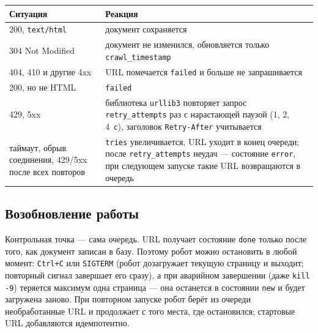 \begin{tabular}{|p{5.2cm}|p{10cm}|}
\hline
Ситуация & Реакция \\ \hline
200, \texttt{text/html} & документ сохраняется \\ \hline
304 Not Modified & документ не изменился, обновляется только
\texttt{crawl\_timestamp} \\ \hline
404, 410 и другие 4xx & URL помечается \texttt{failed} и больше не
запрашивается \\ \hline
200, но не HTML & \texttt{failed} \\ \hline
429, 5xx & библиотека \texttt{urllib3} повторяет запрос
\texttt{retry\_attempts} раз с нарастающей паузой (1, 2, 4~с), заголовок
\texttt{Retry-After} учитывается \\ \hline
таймаут, обрыв соединения, 429/5xx после всех повторов & \texttt{tries}
увеличивается, URL уходит в конец очереди; после \texttt{retry\_attempts}
неудач --- состояние \texttt{error}, при следующем запуске такие URL
возвращаются в очередь \\ \hline
\end{tabular}

\subsection{Возобновление работы}
Контрольная точка --- сама очередь. URL получает состояние \texttt{done} только
после того, как документ записан в базу. Поэтому робот можно остановить в любой
момент: \texttt{Ctrl+C} или \texttt{SIGTERM} (робот дозагружает текущую
страницу и выходит; повторный сигнал завершает его сразу), а при аварийном
завершении (даже \texttt{kill -9}) теряется максимум одна страница --- она
останется в состоянии \texttt{new} и будет загружена заново. При повторном
запуске робот берёт из очереди необработанные URL и продолжает с того места, где
остановился; стартовые URL добавляются идемпотентно.

